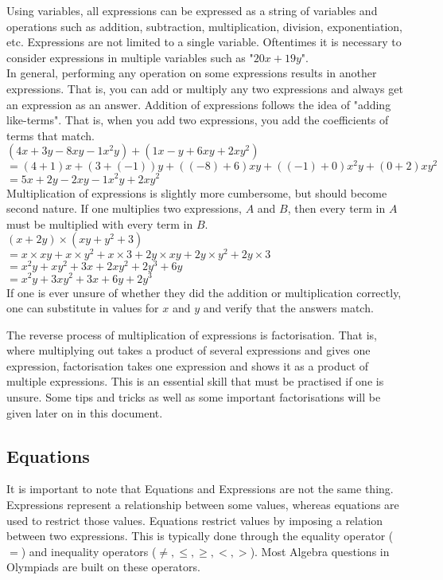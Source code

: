 \documentclass[a4paper,12pt]{article}
\begin{document}
Using variables, all expressions can be expressed as a string of variables and operations such as addition, subtraction, multiplication, division, exponentiation, etc. Expressions are not limited to a single variable. Oftentimes it is necessary to consider expressions in multiple variables such as "$20x + 19y$". \\

In general, performing any operation on some expressions results in another expressions. That is, you can add or multiply any two expressions and always get an expression as an answer. Addition of expressions follows the idea of "adding like-terms". That is, when you add two expressions, you add the coefficients of terms that match. \\

$(4x + 3y - 8xy - 1x^2y) + (1x - y + 6xy + 2xy^2)$ \\
$= (4 + 1)x + (3 + (-1))y + ((-8) + 6)xy + ((-1) + 0)x^2y + (0 + 2)xy^2$ \\
$= 5x + 2y - 2xy - 1x^2y + 2xy^2$ \\

Multiplication of expressions is slightly more cumbersome, but should become second nature. If one multiplies two expressions, $A$ and $B$, then every term in $A$ must be multiplied with every term in $B$. \\

$ (x + 2y) \times (xy + y^2 + 3) $ \\
$= x \times xy + x \times y^2 + x \times 3 + 2y \times xy + 2y \times y^2 + 2y \times 3 $ \\
$= x^2y + xy^2 + 3x + 2xy^2 + 2y^3 + 6y$ \\
$= x^2y + 3xy^2 + 3x + 6y + 2y^3$ \\

If one is ever unsure of whether they did the addition or multiplication correctly, one can substitute in values for $x$ and $y$ and verify that the answers match.

The reverse process of multiplication of expressions is factorisation. That is, where multiplying out takes a product of several expressions and gives one expression, factorisation takes one expression and shows it as a product of multiple expressions. This is an essential skill that must be practised if one is unsure. Some tips and tricks as well as some important factorisations will be given later on in this document.


\subsection{Equations}
It is important to note that Equations and Expressions are not the same thing. Expressions represent a relationship between some values, whereas equations are used to restrict those values. Equations restrict values by imposing a relation between two expressions. This is typically done through the equality operator ($=$) and inequality operators ($\neq, \leq, 
\geq, <, >$). Most Algebra questions in Olympiads are built on these operators.
\end{document}
